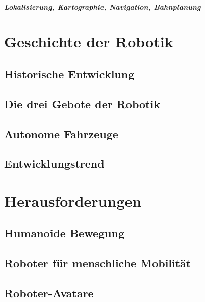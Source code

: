 			\subparagraph{Lokalisierung, Kartographie, Navigation, Bahnplanung} %

	\section{Geschichte der Robotik} %

		\subsection{Historische Entwicklung} %

		\subsection{Die drei Gebote der Robotik} %

		\subsection{Autonome Fahrzeuge} %

		\subsection{Entwicklungstrend} %

	\section{Herausforderungen} %

		\subsection{Humanoide Bewegung} %

		\subsection{Roboter für menschliche Mobilität} %

		\subsection{Roboter-Avatare} %

